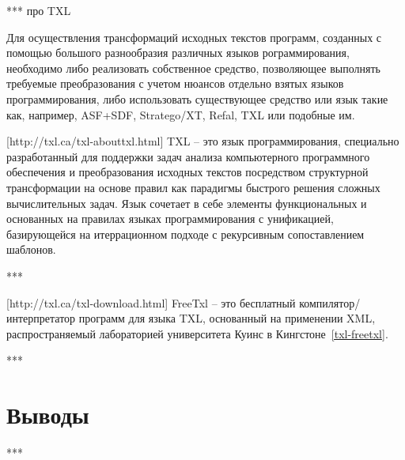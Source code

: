***
про TXL

Для осуществления трансформаций исходных текстов программ, созданных с помощью большого разнообразия различных языков рограммирования, необходимо либо реализовать собственное средство, позволяющее выполнять требуемые преобразования с учетом нюансов отдельно взятых языков программирования, либо использовать существующее средство или язык такие как, например, ASF+SDF, Stratego/XT, Refal, TXL или подобные им.


[http://txl.ca/txl-abouttxl.html]
TXL -- это язык программирования, специально разработанный для поддержки задач анализа компьютерного программного обеспечения и преобразования исходных текстов посредством структурной трансформации на основе правил как парадигмы быстрого решения сложных вычислительных задач.
Язык сочетает в себе элементы функциональных и основанных на правилах языках программирования с унификацией, базирующейся на итеррационном подходе с рекурсивным сопоставлением шаблонов.

***

[http://txl.ca/txl-download.html]
FreeTxl -- это бесплатный компилятор/интерпретатор программ для языка TXL, основанный на применении XML, распространяемый лабораторией университета Куинс в Кингстоне~\ref{txl-freetxl}.

***

\section{Выводы}

***
